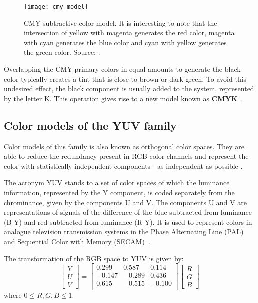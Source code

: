 \begin{figure}[!ht]
  \centering
  \texttt{[image: cmy-model]}
  \caption[CMY subtractive color model]{CMY subtractive color model. It is interesting to note that the intersection of yellow with magenta generates the red color, magenta with cyan generates the blue color and cyan with yellow generates the green color. Source: \citet{rus:08}.}
  \label{fig:cmy-model}
\end{figure}

Overlapping the CMY primary colors in equal amounts to generate the black color typically creates a tint that is close to brown or dark green. To avoid this undesired effect, the black component is usually added to the system, represented by the letter K. This operation gives rise to a new model known as \textbf{CMYK}~\citep{gonzalez:02}.

\subsection{Color models of the YUV family}
\label{sec:modelo_cores_yuv}

Color models of this family is also known as orthogonal color spaces. They are able to reduce the redundancy present in RGB color channels and represent the color with statistically independent components - as independent as possible \citep{kakumanu:07}.

The acronym YUV stands to a set of color spaces of which the luminance information, represented by the Y component, is coded separately from the chrominance, given by the components U and V. The components U and V are representations of signals of the difference of the blue subtracted from luminance (B-Y) and red subtracted from luminance (R-Y). It is used to represent colors in analogue television transmission systems in the Phase Alternating Line (PAL) and Sequential Color with Memory (SECAM)~\citep{pedrini:08}.

The transformation of the RGB space to YUV is given by:\\
\begin{equation}
  \begin{bmatrix}
    Y \\ U \\ V
  \end{bmatrix} = 
  \begin{bmatrix}
     0.299 &  0.587 &  0.114 \\
    -0.147 & -0.289 &  0.436 \\
     0.615 & -0.515 & -0.100 \\
  \end{bmatrix}
  \begin{bmatrix}
    R \\ G \\ B
  \end{bmatrix}
\end{equation}
where $0 \leq R, G, B \leq 1$.

